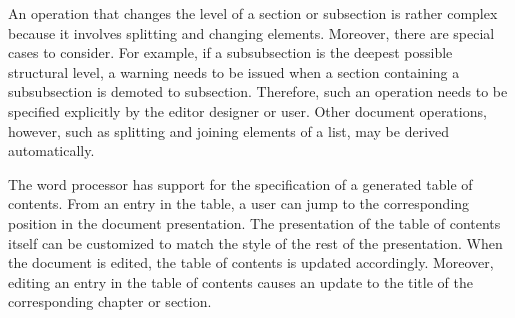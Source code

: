 \documentclass{speauth}
\begin{document}
An operation that changes the level of a section or subsection is rather complex because it involves splitting and changing elements. Moreover, there are special cases to consider. For example, if a subsubsection is the deepest possible structural level, a warning needs to be issued when a section containing a subsubsection is demoted to subsection. Therefore, such an operation needs to be specified explicitly by the editor designer or user. Other document operations, however, such as splitting and joining elements of a list, may be derived automatically.



The word processor has support for the specification of a generated table of contents. From an entry in the table, a user can jump to the corresponding position in the document presentation. The presentation of the table of contents itself can be customized to match the style of the rest of the presentation. When the document is edited, the table of contents is updated accordingly. Moreover, editing an entry in the table of contents causes an update to the title of the corresponding chapter or section.

\newcommand{\editScreenshotTrnsFrSmall}[3]{%
%
\noindent
\begin{center}
\begin{picture}(350,110)(0,0)
\begin{scriptsize}
\put(0,30){ \makebox(160,95){#1}}
\put(-14,30){ \epsfig{file=pics/eps/frameSmall, height=80pt} }
\put(180,30){ \makebox(160,95){#2}}
\put(180,30){ \epsfig{file=pics/eps/frameSmall, height=80pt} }
\end{scriptsize}
\put(166,66){ $\Rightarrow$}
\put(96,0) { \makebox(150,30){#3}}
\end{picture}
\end{center}
}
\end{document}
